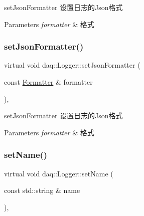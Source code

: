 set\+Json\+Formatter 设置日志的\+Json格式 


\begin{DoxyParams}{Parameters}
{\em formatter} & 格式 \\
\hline
\end{DoxyParams}
\mbox{\label{classdaq_1_1Logger_a6ce72b03ca3604ca2600a0bfe25e5006}} 
\subsubsection{\texorpdfstring{set\+Json\+Formatter()}{setJsonFormatter()}\hspace{0.1cm}{\footnotesize\ttfamily [2/2]}}
{\footnotesize\ttfamily virtual void daq\+::\+Logger\+::set\+Json\+Formatter (\begin{DoxyParamCaption}\item[{const \hyperlink{classdaq_1_1Formatter}{Formatter} \&}]{formatter }\end{DoxyParamCaption})\hspace{0.3cm}{\ttfamily [inline]}, {\ttfamily [virtual]}}



set\+Json\+Formatter 设置日志的\+Json格式 


\begin{DoxyParams}{Parameters}
{\em formatter} & 格式 \\
\hline
\end{DoxyParams}
\mbox{\label{classdaq_1_1Logger_a476bf0f707e09f1a596b0b866bde21fa}} 
\subsubsection{\texorpdfstring{set\+Name()}{setName()}}
{\footnotesize\ttfamily virtual void daq\+::\+Logger\+::set\+Name (\begin{DoxyParamCaption}\item[{const std\+::string \&}]{name }\end{DoxyParamCaption})\hspace{0.3cm}{\ttfamily [inline]}, {\ttfamily [virtual]}}



